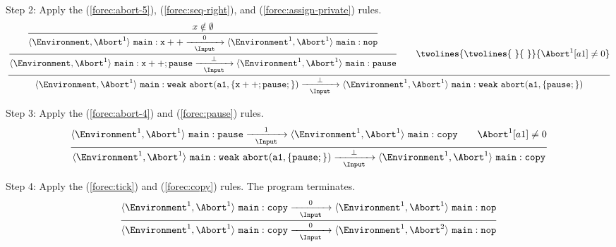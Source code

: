 \noindent
Step 2: Apply the (\ref{forec:abort-5}), (\ref{forec:seq-right}), and (\ref{forec:assign-private}) rules.
\begin{equation*}
	\frac{
		\dfrac{
			\dfrac{
					x \notin \emptyset
				}{
					\langle \Environment, \Abort^1 \rangle ~ \mathtt{main: x++}
						\xrightarrow[~~\Input~~]{0} 
					\langle \Environment^1, \Abort^1 \rangle ~ \mathtt{main: nop}
				}
			}{
				\langle \Environment, \Abort^1 \rangle ~ \mathtt{main:x++; pause}
					\xrightarrow[~~\Input~~]{\bot} 
				\langle \Environment^1, \Abort^1 \rangle ~ \mathtt{main:pause}
			}
			\qquad
			\twolines{
					\twolines{~}{~}
				}{
					\Abort^1[a1] \neq 0
				}
		}{
			\langle \Environment, \Abort^1 \rangle ~ \mathtt{main: weak~abort(a1, \{x++; pause;\})}
				\xrightarrow[~~\Input~~]{\bot} 
			\langle \Environment^1, \Abort^1 \rangle ~ \mathtt{main: weak~abort(a1, \{pause;\})}
		}
\end{equation*}

\noindent
Step 3: Apply the (\ref{forec:abort-4}) and (\ref{forec:pause}) 
rules.
\begin{equation*}
	\frac{
			\langle \Environment^1, \Abort^1 \rangle ~ \mathtt{main: pause}
				\xrightarrow[~~\Input~~]{1} 
			\langle \Environment^1, \Abort^1 \rangle ~ \mathtt{main: copy}
			\qquad
			\Abort^1[a1] \neq 0
		}{
			\langle \Environment^1, \Abort^1 \rangle ~ \mathtt{main: weak~abort(a1, \{pause;\})}
				\xrightarrow[~~\Input~~]{\bot} 
			\langle \Environment^1, \Abort^1 \rangle ~ \mathtt{main: copy}
		}
\end{equation*}

\noindent
Step 4: Apply the (\ref{forec:tick}) and (\ref{forec:copy}) 
rules. The program terminates.
\begin{equation*}
	\frac{
			\langle \Environment^1, \Abort^1 \rangle ~ \mathtt{main: copy}
				\xrightarrow[~~\Input~~]{0} 
			\langle \Environment^1, \Abort^1 \rangle ~ \mathtt{main: nop}
		}{
			\langle \Environment^1, \Abort^1 \rangle ~ \mathtt{main: copy}
				\xrightarrow[~~\Input~~]{0} 
			\langle \Environment^1, \Abort^2 \rangle ~ \mathtt{main: nop}
		}
\end{equation*}
